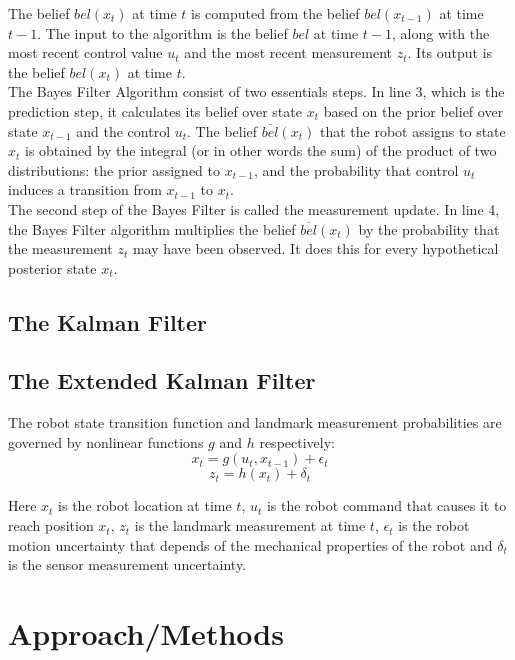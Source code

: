 \documentclass[conference]{IEEEtran}
\begin{document}
The belief $bel(x_t)$ at time $t$ is computed from the belief $bel(x_{t-1})$ at time $t-1$. The input to the algorithm is the belief $bel$ at time $t-1$, along with the most recent control value $u_t$ and the most recent measurement $z_t$. Its output is the belief $bel(x_t)$ at time $t$.\\

The Bayes Filter Algorithm consist of two essentials steps. In line 3, which is the prediction step, it calculates its belief over state $x_t$ based on the prior belief over state $x_{t-1}$ and the control $u_t$. The belief $\overline{bel}(x_t)$ that the robot assigns to state $x_t$ is obtained by the integral (or in other words the sum) of the product of two distributions: the prior assigned to $x_{t-1}$, and the probability that control $u_t$ induces a transition from $x_{t-1}$ to $x_t$.\\

The second step of the Bayes Filter is called the measurement update. In line 4, the Bayes Filter algorithm multiplies the belief $\overline{bel}(x_t)$ by the probability that the measurement $z_t$ may have been observed. It does this for every hypothetical posterior state $x_t$.
\subsection{The Kalman Filter}
\subsection{The Extended Kalman Filter}
The robot state transition function and landmark measurement probabilities are governed by nonlinear functions $g$ and $h$ respectively\cite{thrun}:
\begin{equation}\label{transition}
x_{t} = g(u_{t}, x_{t-1}) + \epsilon_{t}
\end{equation}
\begin{equation}\label{measurement}
z_{t} = h(x_{t}) + \delta_{t}
\end{equation}

Here $x_{t}$ is the robot location at time $t$, $u_{t}$ is the robot command that causes it to reach position $x_{t}$, $z_{t}$ is the landmark measurement at time $t$, $\epsilon_{t}$ is the robot motion uncertainty that depends of the mechanical properties of the robot and $\delta_{t}$ is the sensor measurement uncertainty. \\

\section{Approach/Methods}
\end{document}
